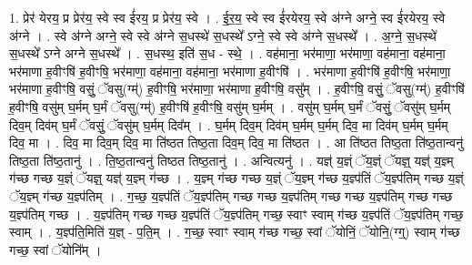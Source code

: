 \documentclass[17pt]{extarticle}
\begin{document}
1. प्रेर॑ येरय॒ प्र प्रेर॑य॒ स्वे स्व ई॑रय॒ प्र प्रेर॑य॒ स्वे । . ई॒र॒य॒ स्वे स्व ई॑रयेरय॒ स्वे अ॑ग्ने अग्ने॒ स्व ई॑रयेरय॒ स्वे अ॑ग्ने । . स्वे अ॑ग्ने अग्ने॒ स्वे स्वे अ॑ग्ने स॒धस्थे॑ स॒धस्थे᳚ ऽग्ने॒ स्वे स्वे अ॑ग्ने स॒धस्थे᳚ । . अ॒ग्ने॒ स॒धस्थे॑ स॒धस्थे᳚ ऽग्ने अग्ने स॒धस्थे᳚ । . स॒धस्थ॒ इति॑ स॒ध - स्थे॒ । . वह॑माना॒ भर॑माणा॒ भर॑माणा॒ वह॑माना॒ वह॑माना॒ भर॑माणा ह॒वीꣳषि॑ ह॒वीꣳषि॒ भर॑माणा॒ वह॑माना॒ वह॑माना॒ भर॑माणा ह॒वीꣳषि॑ । . भर॑माणा ह॒वीꣳषि॑ ह॒वीꣳषि॒ भर॑माणा॒ भर॑माणा ह॒वीꣳषि॒ वसुं॒ ॅवसु(ग्म्॑) ह॒वीꣳषि॒ भर॑माणा॒ भर॑माणा ह॒वीꣳषि॒ वसु᳚म् । . ह॒वीꣳषि॒ वसुं॒ ॅवसु(ग्म्॑) ह॒वीꣳषि॑ ह॒वीꣳषि॒ वसु॑म् घ॒र्मम् घ॒र्मं ॅवसु(ग्म्॑) ह॒वीꣳषि॑ ह॒वीꣳषि॒ वसु॑म् घ॒र्मम् । . वसु॑म् घ॒र्मम् घ॒र्मं ॅवसुं॒ ॅवसु॑म् घ॒र्मम् दिव॒म् दिव॑म् घ॒र्मं ॅवसुं॒ ॅवसु॑म् घ॒र्मम् दिव᳚म् । . घ॒र्मम् दिव॒म् दिव॑म् घ॒र्मम् घ॒र्मम् दिव॒ मा दिव॑म् घ॒र्मम् घ॒र्मम् दिव॒ मा । . दिव॒ मा दिव॒म् दिव॒ मा ति॑ष्ठत तिष्ठ॒ता दिव॒म् दिव॒ मा ति॑ष्ठत । . आ ति॑ष्ठत तिष्ठ॒ता ति॑ष्ठ॒तान्वनु॑ तिष्ठ॒ता ति॑ष्ठ॒तानु॑ । . ति॒ष्ठ॒तान्वनु॑ तिष्ठत तिष्ठ॒तानु॑ । . अन्वित्यनु॑ । . यज्ञ्॑ य॒ज्ञ्ं ॅय॒ज्ञ्ं ॅयज्ञ्॒ यज्ञ्॑ य॒ज्ञ्म् ग॑च्छ गच्छ य॒ज्ञ्ं ॅयज्ञ्॒ यज्ञ्॑ य॒ज्ञ्म् ग॑च्छ । . य॒ज्ञ्म् ग॑च्छ गच्छ य॒ज्ञ्ं ॅय॒ज्ञ्म् ग॑च्छ य॒ज्ञ्प॑तिं ॅय॒ज्ञ्प॑तिम् गच्छ य॒ज्ञ्ं ॅय॒ज्ञ्म् ग॑च्छ य॒ज्ञ्प॑तिम् । . ग॒च्छ॒ य॒ज्ञ्प॑तिं ॅय॒ज्ञ्प॑तिम् गच्छ गच्छ य॒ज्ञ्प॑तिम् गच्छ गच्छ य॒ज्ञ्प॑तिम् गच्छ गच्छ य॒ज्ञ्प॑तिम् गच्छ । . य॒ज्ञ्प॑तिम् गच्छ गच्छ य॒ज्ञ्प॑तिं ॅय॒ज्ञ्प॑तिम् गच्छ॒ स्वाꣳ स्वाम् ग॑च्छ य॒ज्ञ्प॑तिं ॅय॒ज्ञ्प॑तिम् गच्छ॒ स्वाम् । . य॒ज्ञ्प॑ति॒मिति॑ य॒ज्ञ् - प॒ति॒म् । . ग॒च्छ॒ स्वाꣳ स्वाम् ग॑च्छ गच्छ॒ स्वां ॅयोनिं॒ ॅयोनि॒(ग्ग्॒) स्वाम् ग॑च्छ गच्छ॒ स्वां ॅयोनि᳚म् । \newline
\end{document}
